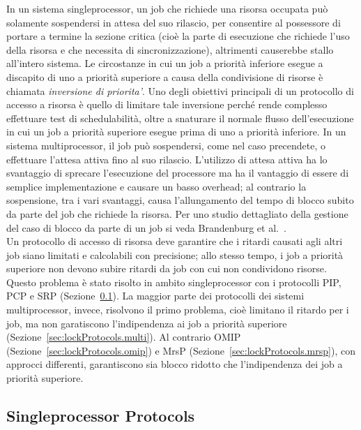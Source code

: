 In un sistema singleprocessor, un job che richiede una risorsa occupata può solamente sospendersi in attesa del suo rilascio, per consentire al possessore di portare a termine la sezione critica (cioè la parte di esecuzione che richiede l'uso della risorsa e che necessita di sincronizzazione), altrimenti causerebbe stallo all'intero sistema. Le circostanze in cui un job a priorità inferiore esegue a discapito di uno a priorità superiore a causa della condivisione di risorse è chiamata \textit{inversione di priorita'}. Uno degli obiettivi principali di un protocollo di accesso a risorsa è quello di limitare tale inversione perché rende complesso effettuare test di schedulabilità, oltre a snaturare il normale flusso dell'esecuzione in cui un job a priorità superiore esegue prima di uno a priorità inferiore. In un sistema multiprocessor, il job può sospendersi, come nel caso precendete, o effettuare l'attesa attiva fino al suo rilascio. L'utilizzo di attesa attiva ha lo svantaggio di sprecare l'esecuzione del processore ma ha il vantaggio di essere di semplice implementazione e causare un basso overhead; al contrario la sospensione, tra i vari svantaggi, causa l'allungamento del tempo di blocco subito da parte del job che richiede la risorsa. Per uno studio dettagliato della gestione del caso di blocco da parte di un job si veda Brandenburg et al.~\cite{Brandenburg:2008:RSM:1440456.1440601}.\\

Un protocollo di accesso di risorsa deve garantire che i ritardi causati agli altri job siano limitati e calcolabili con precisione; allo stesso tempo, i job a priorità superiore non devono subire ritardi da job con cui non condividono risorse. Questo problema è stato risolto in ambito singleprocessor con i protocolli PIP, PCP e SRP (Sezione~\ref{sec:lockProtocols.single}). La maggior parte dei protocolli dei sistemi multiprocessor, invece, risolvono il primo problema, cioè limitano il ritardo per i job, ma non garatiscono l'indipendenza ai job a priorità superiore (Sezione~\ref{sec:lockProtocols.multi}). Al contrario OMIP (Sezione~\ref{sec:lockProtocols.omip}) e MrsP (Sezione~\ref{sec:lockProtocols.mrsp}), con approcci differenti, garantiscono sia blocco ridotto che l'indipendenza dei job a priorità superiore.\\

\subsection{Singleprocessor Protocols}
\label{sec:lockProtocols.single}

